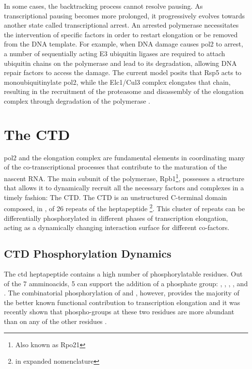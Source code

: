 In some cases, the backtracking process cannot resolve pausing.
As transcriptional pausing becomes more prolonged, it progressively evolves towards another state called transcriptional arrest.
An arrested polymerase necessitates the intervention of specific factors in order to restart elongation or be removed from the DNA template.
For example, when DNA damage causes \gls{pol2} to arrest, a number of sequentially acting E3 ubiquitin ligases are required to attach ubiquitin chains on the polymerase and lead to its degradation, allowing DNA repair factors to access the damage. 
The current model posits that Rsp5 acts to monoubiquitinylate \gls{pol2}, while the Elc1/Cul3 complex elongates that chain, resulting in the recruitment of the proteasome and disassembly of the elongation complex through degradation of the polymerase \cite{beaudenon:1999:rsp5}.



\section{The CTD}
\gls{pol2} and the elongation complex are fundamental elements in coordinating many of the co-transcriptional processes that contribute to the maturation of the nascent RNA.
The main subunit of the polymerase, Rpb1\footnote{Also known as Rpo21}, possesses a structure that allows it to dynamically recruit all the necessary factors and complexes in a timely fashion: The CTD. 
The CTD is an unstructured C-terminal domain composed, in \cer, of 26 repeats of the heptapeptide \ctdshort{}\footnote{\ctdlong{} in expanded nomenclature}.
This cluster of repeats can be differentially phosphorylated in different phases of transcription elongation, acting as a dynamically changing interaction surface for different co-factors. 

\subsection{CTD Phosphorylation Dynamics} 
The \gls{ctd} heptapeptide contains a high number of phosphorylatable residues.
Out of the 7 amminoacids, 5 can support the addition of a phosphate group: \tyr{}, \sert{}, \thr{}, \serf{}, and \sers{}.
The combinatorial phosphorylation of \sert{} and \serf{}, however, provides the majority of the better known functional contribution to transcription elongation and it was recently shown that phospho-groups at these two residues are more abundant than on any of the other residues \citep{suh:2016:direct}.

